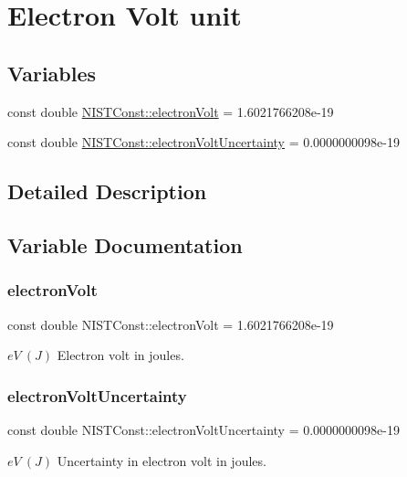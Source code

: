 \hypertarget{group___n_i_s_t_const-_electron_volt_unit}{}\section{Electron Volt unit}
\label{group___n_i_s_t_const-_electron_volt_unit}
\subsection*{Variables}
\begin{DoxyCompactItemize}
\item 
const double \hyperlink{group___n_i_s_t_const-_electron_volt_unit_ga24c6771adb5c4de68575b1a77f0b2415}{N\+I\+S\+T\+Const\+::electron\+Volt} = 1.\+6021766208e-\/19
\item 
const double \hyperlink{group___n_i_s_t_const-_electron_volt_unit_ga2318526ee8cb14064a4a45806fd8cb0c}{N\+I\+S\+T\+Const\+::electron\+Volt\+Uncertainty} = 0.\+0000000098e-\/19
\end{DoxyCompactItemize}


\subsection{Detailed Description}


\subsection{Variable Documentation}
\mbox{\label{group___n_i_s_t_const-_electron_volt_unit_ga24c6771adb5c4de68575b1a77f0b2415}} 
\subsubsection{\texorpdfstring{electron\+Volt}{electronVolt}}
{\footnotesize\ttfamily const double N\+I\+S\+T\+Const\+::electron\+Volt = 1.\+6021766208e-\/19}

$eV \ (J)$ Electron volt in joules. \mbox{\label{group___n_i_s_t_const-_electron_volt_unit_ga2318526ee8cb14064a4a45806fd8cb0c}} 
\subsubsection{\texorpdfstring{electron\+Volt\+Uncertainty}{electronVoltUncertainty}}
{\footnotesize\ttfamily const double N\+I\+S\+T\+Const\+::electron\+Volt\+Uncertainty = 0.\+0000000098e-\/19}

$eV \ (J)$ Uncertainty in electron volt in joules. 